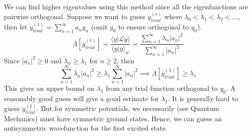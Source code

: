 \documentclass[a4paper]{article}
\begin{document}
\begin{remarks}
We can find higher eigenvalues using this method since all the eigenfunctions are pairwise orthogonal. Suppose we want to guess $y^{(r)}_{trial}$ where $\lambda_0<\lambda_1<\lambda_2<\dots$, then let $y_{trial}^{(1)}=\sum_{n=1}^\infty a_ny_n$ (omit $y_0$ to ensure orthogonal to $y_0$). 
\begin{equation}
\Lambda[y_{trial}^{(1)}]=\frac{\langle y|\mathcal{L}y\rangle}{\langle y|y\rangle_w}=\frac{\sum_{n=1}^\infty\lambda_n|a_n|^2}{\sum_{n=1}^\infty|a_n|^2}\tag{9.15}
\end{equation}
Since $|a_n|^2\geq0$ and $\lambda_n\geq\lambda_1$ for $n\geq2$, then 
$$\sum_{n=1}^\infty\lambda_n|a_n|^2\geq\lambda_1\sum_{n=1}^\infty|a_n|^2\implies\Lambda[y_{trial}^{(1)}]\geq\lambda_1$$
This gives an upper bound on $\lambda_1$ from any trial function orthogonal to $y_0$. A reasonably good guess will give a good estimate for $\lambda_1$. It is generally hard to guess $y_{trial}^{(1)}$. But for symmetric potentials, we necessarily (see Quantum Mechanics) must have symmetric ground states. Hence, we can guess an antisymmetric wavefunction for the first excited state.
\end{remarks}

\newpage
\end{document}
